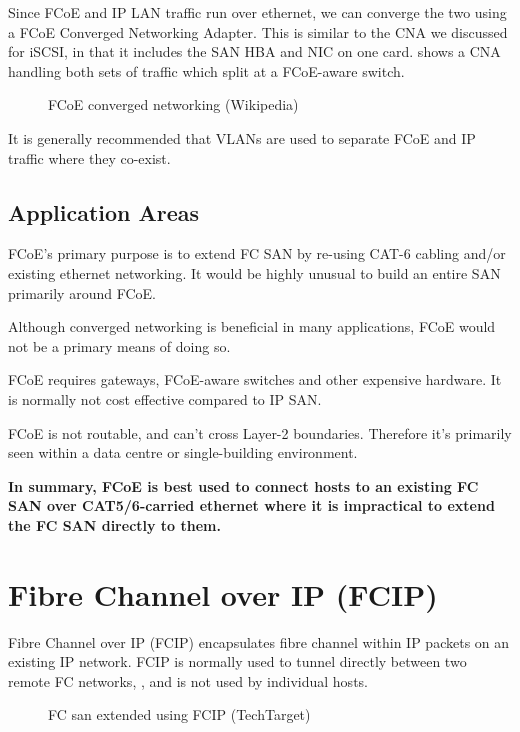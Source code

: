Since FCoE and IP LAN traffic run over ethernet, we can converge the two
using a FCoE Converged Networking Adapter. This is similar to the CNA we
discussed for iSCSI, in that it includes the SAN HBA and NIC on one
card. shows a CNA handling both sets of traffic which split at a
FCoE-aware switch.

\begin{figure}
\centering
\caption{FCoE converged networking (Wikipedia){}}
\end{figure}

It is generally recommended that VLANs are used to separate FCoE and IP
traffic where they co-exist.

\subsection{Application Areas}\label{application-areas}

FCoE's primary purpose is to extend FC SAN by re-using CAT-6 cabling
and/or existing ethernet networking. It would be highly unusual to build
an entire SAN primarily around FCoE.

Although converged networking is beneficial in many applications, FCoE
would not be a primary means of doing so.

FCoE requires gateways, FCoE-aware switches and other expensive
hardware. It is normally not cost effective compared to IP SAN.

FCoE is not routable, and can't cross Layer-2 boundaries. Therefore it's
primarily seen within a data centre or single-building environment.

\textbf{In summary, FCoE is best used to connect hosts to an existing FC
SAN over CAT5/6-carried ethernet where it is impractical to extend the
FC SAN directly to them.}

\section{Fibre Channel over IP (FCIP)}\label{fibre-channel-over-ip-fcip}

Fibre Channel over IP (FCIP) encapsulates fibre channel within IP
packets on an existing IP network. FCIP is normally used to tunnel
directly between two remote FC networks, , and is not used by individual
hosts.

\begin{figure}
\centering
\caption{FC san extended using FCIP (TechTarget){}}
\end{figure}

